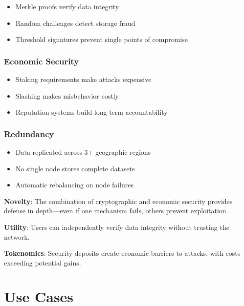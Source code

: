 \documentclass[12pt,a4paper]{article}
\begin{document}
\begin{itemize}
    \item Merkle proofs verify data integrity
    \item Random challenges detect storage fraud
    \item Threshold signatures prevent single points of compromise
\end{itemize}

\subsubsection{Economic Security}

\begin{itemize}
    \item Staking requirements make attacks expensive
    \item Slashing makes misbehavior costly
    \item Reputation systems build long-term accountability
\end{itemize}

\subsubsection{Redundancy}

\begin{itemize}
    \item Data replicated across 3+ geographic regions
    \item No single node stores complete datasets
    \item Automatic rebalancing on node failures
\end{itemize}

\noindent\textbf{Novelty}: The combination of cryptographic and economic security provides defense in depth—even if one mechanism fails, others prevent exploitation.

\noindent\textbf{Utility}: Users can independently verify data integrity without trusting the network.

\noindent\textbf{Tokenomics}: Security deposits create economic barriers to attacks, with costs exceeding potential gains.

\section{Use Cases}
\end{document}

